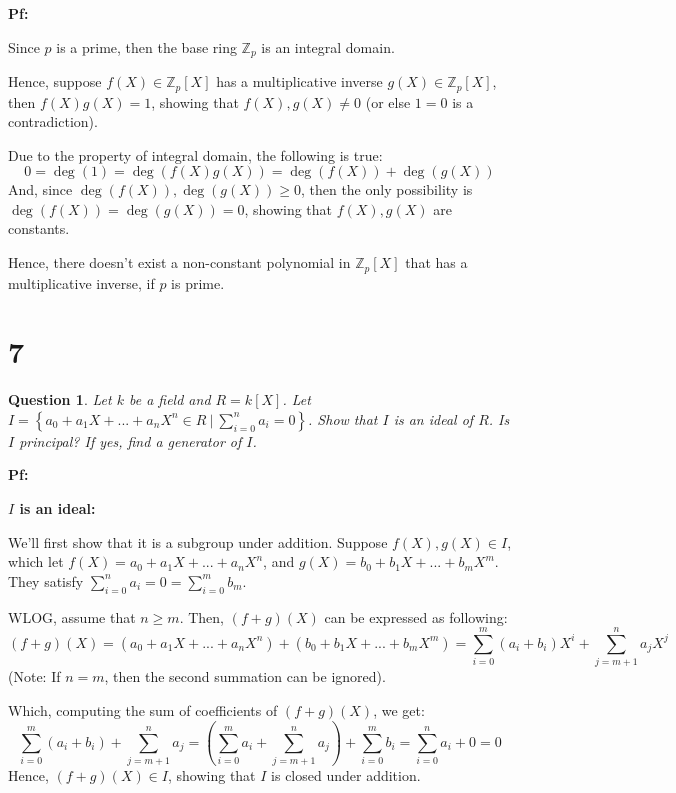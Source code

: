 \documentclass{article}
\newtheorem{question}{Question}
\begin{document}
\textbf{Pf:}

Since $p$ is a prime, then the base ring $\mathbb{Z}_p$ is an integral domain. 

Hence, suppose $f(X)\in\mathbb{Z}_p[X]$ has a multiplicative inverse $g(X)\in\mathbb{Z}_p[X]$, then $f(X)g(X)=1$,
showing that $f(X),g(X)\neq 0$ (or else $1=0$ is a contradiction).

\hfill

Due to the property of integral domain, the following is true:
$$0=\deg(1)=\deg(f(X)g(X))=\deg(f(X))+\deg(g(X))$$
And, since $\deg(f(X)),\deg(g(X))\geq 0$, then the only possibility is $\deg(f(X))=\deg(g(X))=0$,
showing that $f(X),g(X)$ are constants.

Hence, there doesn't exist a non-constant polynomial in $\mathbb{Z}_p[X]$ that has a multiplicative inverse,
if $p$ is prime.

\break

\section*{7}
\begin{myBox}[]{}
    \begin{question}
        Let $k$ be a field and $R=k[X]$. Let $I=\left\{a_0+a_1X+...+a_nX^n\in R\ |\ \sum_{i=0}^{n}a_i=0\right\}$.
        Show that $I$ is an ideal of $R$. Is $I$ principal? If yes, find a generator of $I$.
    \end{question}
\end{myBox}

\textbf{Pf:}

\textbf{$I$ is an ideal:}

We'll first show that it is a subgroup under addition. Suppose $f(X),g(X)\in I$, which let $f(X)=a_0+a_1X+...+a_nX^n$, and $g(X)=b_0+b_1X+...+b_mX^m$.
They satisfy $\sum_{i=0}^{n}a_i=0 = \sum_{i=0}^{m}b_m$.

WLOG, assume that $n\geq m$. Then, $(f+g)(X)$ can be expressed as following:
$$(f+g)(X)=(a_0+a_1X+...+a_nX^n)+(b_0+b_1X+...+b_mX^m) = \sum_{i=0}^{m}(a_i+b_i)X^i + \sum_{j=m+1}^{n}a_jX^j$$
(Note: If $n=m$, then the second summation can be ignored).

Which, computing the sum of coefficients of $(f+g)(X)$, we get:
$$\sum_{i=0}^{m}(a_i+b_i)+\sum_{j=m+1}^{n}a_j = \left(\sum_{i=0}^{m}a_i+\sum_{j=m+1}^{n}a_j\right)+\sum_{i=0}^{m}b_i = \sum_{i=0}^{n}a_i + 0 = 0$$
Hence, $(f+g)(X)\in I$, showing that $I$ is closed under addition.

\hfill
\end{document}
